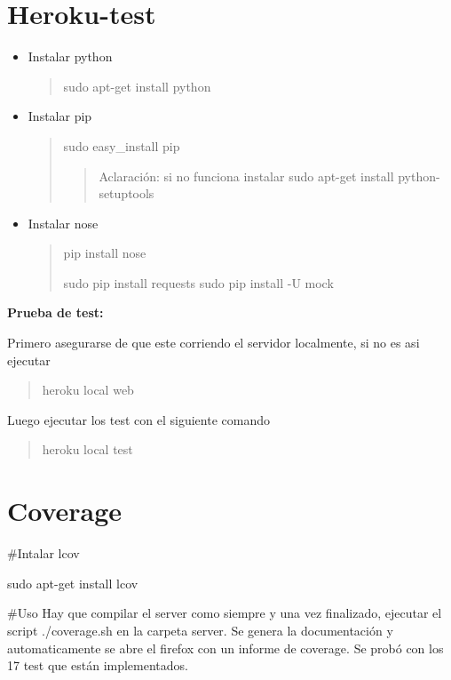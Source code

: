 \documentclass[letterpaper,10pt,spanish]{sphinxmanual}
\begin{document}
\section{Heroku-test}
\label{Heroku-test::doc}\label{Heroku-test:heroku-test}\begin{itemize}
\item {} 
Instalar python
\begin{quote}

sudo apt-get install python
\end{quote}

\item {} 
Instalar pip
\begin{quote}

sudo easy\_install pip
\begin{quote}

Aclaración: si no funciona instalar sudo apt-get install python-setuptools
\end{quote}
\end{quote}

\item {} 
Instalar nose
\begin{quote}

pip install nose

sudo pip install requests
sudo pip install -U mock
\end{quote}

\end{itemize}

\textbf{Prueba de test:}

Primero asegurarse de que este corriendo el servidor localmente, si no es asi ejecutar
\begin{quote}

heroku local web
\end{quote}

Luego ejecutar los test con el siguiente comando
\begin{quote}

heroku local test
\end{quote}


\section{Coverage}
\label{Coverage::doc}\label{Coverage:coverage}
\#Intalar lcov

sudo apt-get install lcov

\#Uso
Hay que compilar el server como siempre y una vez finalizado, ejecutar el script ./coverage.sh en la carpeta server. Se genera la documentación y automaticamente se abre el firefox con un informe de coverage.
Se probó con los 17 test que están implementados.
\end{document}
